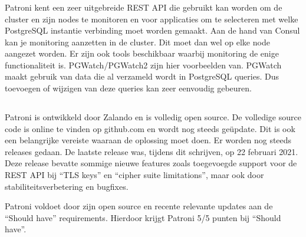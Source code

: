 \subsubsection{}
\label{subsubsec:Monitoring}

Patroni kent een zeer uitgebreide REST API die gebruikt kan worden om de cluster en zijn nodes te monitoren en voor applicaties om te selecteren met welke PostgreSQL instantie verbinding moet worden gemaakt. Aan de hand van Consul kan je monitoring aanzetten in de cluster. Dit moet dan wel op elke node aangezet worden.
Er zijn ook tools beschikbaar waarbij monitoring de enige functionaliteit is. PGWatch/PGWatch2 zijn hier voorbeelden van. PGWatch maakt gebruik van data die al verzameld wordt in PostgreSQL queries. Dus toevoegen of wijzigen van deze queries kan zeer eenvoudig gebeuren.

\subsection{}
\label{subsec:Should have}

Patroni is ontwikkeld door Zalando en is volledig open source. De volledige source code is online te vinden op github.com en wordt nog steeds geüpdate. Dit is ook een belangrijke vereiste waaraan de oplossing moet doen. Er worden  nog steeds releases gedaan. De laatste release was, tijdens dit schrijven, op 22 februari 2021. Deze release bevatte sommige nieuwe features zoals toegevoegde support voor de REST API bij “TLS keys” en “cipher suite limitations”, maar ook door stabiliteitsverbetering en bugfixes.

Patroni voldoet door zijn open source en recente relevante updates aan de “Should have” requirements. Hierdoor krijgt Patroni 5/5 punten bij “Should have”.

\subsubsection{}
\label{subsubsec:Actieve ondersteuning in 2020-2021}

\subsubsection{}
\label{subsubsec:Open source}


